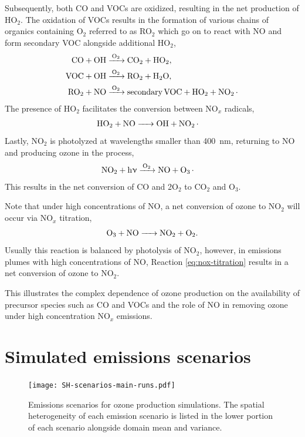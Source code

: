 Subsequently, both CO and VOCs are oxidized, resulting in the net production of HO$_2$. The oxidation of VOCs results in the formation of various chains of organics containing O$_2$ referred to as RO$_2$ which go on to react with NO and form secondary VOC alongside additional HO$_2$, 
\begin{align}
    \ce{
    CO + OH &->[O_2] CO_2 + HO_2, \\ 
   VOC + OH &->[O_2] RO_2 + H_2O, \\
   RO_2 + NO &->[O_2] secondary VOC + HO_2 + NO_2.
       }
\end{align}
The presence of HO$_2$ facilitates the conversion between NO$_x$ radicals, 
\begin{align}
    \ce{
    HO_2 + NO &-> OH + NO_2. 
       }
\end{align}
Lastly, NO$_2$ is photolyzed at wavelengths smaller than 400~nm, returning to NO and producing ozone in the process,
\begin{align}
\ce{NO_2 + h\nu &->[O_2] NO + O_3.}
\end{align}
This results in the net conversion of CO and 2O$_2$ to CO$_2$ and O$_3$. 

Note that under high concentrations of NO, a net conversion of ozone to NO$_2$ will occur via NO$_x$ titration, 
\begin{equation}
\ce{O_3 + NO -> NO_2 + O_2}.
\label{eq:nox-titration}
\end{equation}
Usually this reaction is balanced by photolysis of NO$_2$, however, in emissions plumes with high concentrations of NO, Reaction \ref{eq:nox-titration} results in a net conversion of ozone to NO$_2$. 

This illustrates the complex dependence of ozone production on the availability of precursor species such as CO and VOCs and the role of NO in removing ozone under high concentration NO$_x$ emissions. 

\section{Simulated emissions scenarios}\label{gas-emission-scenarios}

\begin{figure}[h]
	\centering
	\texttt{[image: SH-scenarios-main-runs.pdf]}
	\caption{Emissions scenarios for ozone production simulations. The spatial heterogeneity of each emission scenario is listed in the lower portion of each scenario alongside domain mean and variance.}
	\label{fig:ozone-emission-patterns}
\end{figure}

